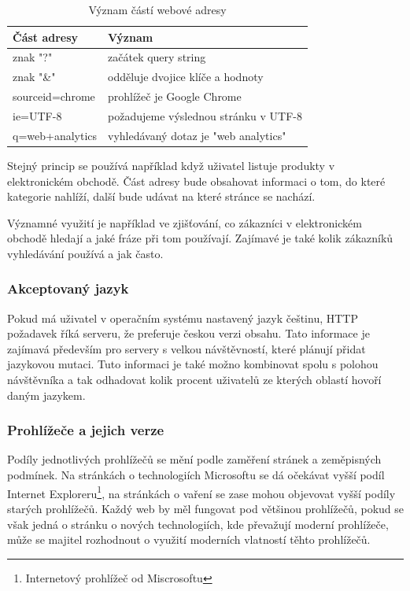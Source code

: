 \documentclass[bc,male,java,dept456]{diploma}						%
\begin{document}
\begin{table}
	\centering
	\begin{tabular}{ll}
	Část adresy & Význam \\	\hline \smallskip
	znak "?" & začátek query string \\ \smallskip
	znak "\&" & odděluje dvojice klíče a hodnoty \\ \smallskip
	sourceid=chrome & prohlížeč je Google Chrome \\ \smallskip
	ie=UTF-8 & požadujeme výslednou stránku v UTF-8 \\ \smallskip
	q=web+analytics & vyhledávaný dotaz je "web analytics"
\end{tabular}
	\caption{Význam částí webové adresy}	
	\label{table:web_address_meaning}	
\end{table}


\bigskip

Stejný princip se používá například když uživatel listuje produkty v elektronickém obchodě. Část adresy bude obsahovat informaci o tom, do které kategorie nahlíží, další bude udávat na které stránce se nachází.

Významné využití je například ve zjišťování, co zákazníci v elektronickém obchodě hledají a jaké fráze při tom používají. Zajímavé je také kolik zákazníků vyhledávání používá a jak často.

\subsubsection{Akceptovaný jazyk}

Pokud má uživatel v operačním systému nastavený jazyk češtinu, HTTP požadavek říká serveru, že preferuje českou verzi obsahu. Tato informace je zajímavá především pro servery s velkou návštěvností, které plánují přidat jazykovou mutaci. Tuto informaci je také možno kombinovat spolu s polohou návštěvníka a tak odhadovat kolik procent uživatelů ze kterých oblastí hovoří daným jazykem.


\subsubsection{Prohlížeče a jejich verze}

Podíly jednotlivých prohlížečů se mění podle zaměření stránek a zeměpisných podmínek. Na stránkách o technologiích Microsoftu se dá očekávat vyšší podíl Internet Exploreru\footnote{Internetový prohlížeč od Miscrosoftu}, na stránkách o vaření se zase mohou objevovat vyšší podíly starých prohlížečů. Každý web by měl fungovat pod většinou prohlížečů, pokud se však jedná o stránku o nových technologiích, kde převažují moderní prohlížeče, může se majitel rozhodnout o využití moderních vlatností těhto prohlížečů.
\end{document}
